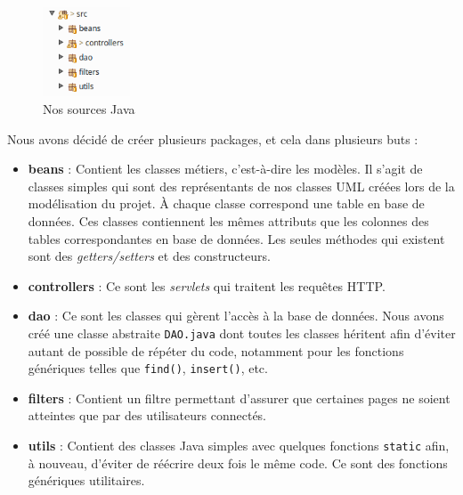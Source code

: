 \begin{figure}
  \vspace{-20pt}
  \begin{center}
    \includegraphics[width=0.23\textwidth]{images/src_archi.png}
  \end{center}
  \vspace{-10pt}
  \caption{Nos sources Java}
  \vspace{-10pt}
\end{figure}

Nous avons décidé de créer plusieurs packages, et cela dans plusieurs buts :

\begin{itemize}
    \item \textbf{beans} : Contient les classes métiers, c'est-à-dire les modèles. Il s'agit de classes simples qui sont des représentants de nos classes UML créées lors de la modélisation du projet. À chaque classe correspond une table en base de données. Ces classes contiennent les mêmes attributs que les colonnes des tables correspondantes en base de données. Les seules méthodes qui existent sont des \textit{getters/setters} et des constructeurs.
    \item \textbf{controllers} : Ce sont les \textit{servlets} qui traitent les requêtes HTTP.
    \item \textbf{dao} : Ce sont les classes qui gèrent l'accès à la base de données. Nous avons créé une classe abstraite \lstinline{DAO.java} dont toutes les classes héritent afin d'éviter autant de possible de répéter du code, notamment pour les fonctions génériques telles que \lstinline{find()}, \lstinline{insert()}, etc.
\end{itemize}

\begin{itemize}
    \item \textbf{filters} : Contient un filtre permettant d'assurer que certaines pages ne soient atteintes que par des utilisateurs connectés.
    \item \textbf{utils} : Contient des classes Java simples avec quelques fonctions \lstinline{static} afin, à nouveau, d'éviter de réécrire deux fois le même code. Ce sont des fonctions génériques utilitaires.
\end{itemize}

